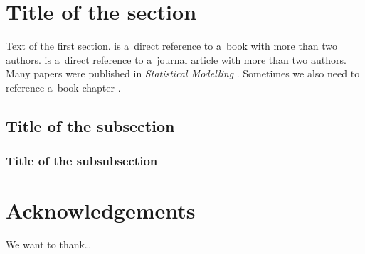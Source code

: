 \documentclass[submit]{smj}
\begin{document}
\maketitle


\section{Title of the section}
Text of the first section. \citet{Fahrmeiret13} is a~direct reference to a~book with more than two authors.
\citet{Gomezet09} is a~direct reference to a~journal article with more than two authors.
Many papers were published in \emph{Statistical Modelling} \citep[see, e.g.,][]{Kneib13, KomarekLesaffre06, Liet07, Waldmannet13}.
Sometimes we also need to reference a~book chapter \citep{Lesaffreet09}.

\subsection{Title of the subsection}

\subsubsection{Title of the subsubsection}


\section*{Acknowledgements}
We want to thank\ldots



\end{document}
